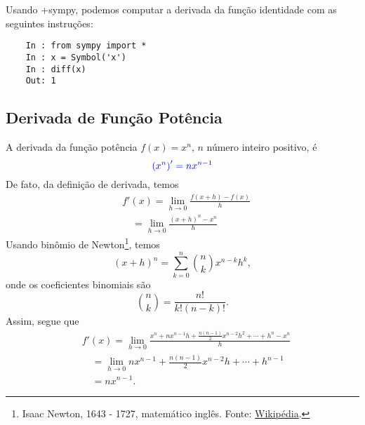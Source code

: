 \ifispython
\begin{ex}
  Usando {\python}+{sympy}, podemos computar a derivada da função identidade com as seguintes instruções:
  \begin{lstlisting}
    In : from sympy import *
    In : x = Symbol('x')
    In : diff(x)
    Out: 1
  \end{lstlisting}
\end{ex}
\fi

\subsection{Derivada de Função Potência}\label{cap_deriv_sec_funcip:ssec:funpot}

A derivada da função potência $f(x) = x^n$, $n$ número inteiro positivo, é
\begin{equation}
  {\color{blue}\left(x^n\right)' = nx^{n-1}}
\end{equation}
De fato, da definição de derivada, temos
\begin{align}
  & f'(x) = \lim_{h\to 0} \frac{f(x+h)-f(x)}{h}\\
  & \text{}\quad = \lim_{h\to 0} \frac{(x+h)^n-x^n}{h}
\end{align}
Usando binômio de Newton\footnote{Isaac Newton, 1643 - 1727, matemático inglês. Fonte: \href{https://pt.wikipedia.org/wiki/Isaac_Newton}{Wikipédia}.}, temos
\begin{equation}
  (x+h)^n = \sum_{k=0}^n \binom{n}{k}x^{n-k}h^k,
\end{equation}
onde os coeficientes binomiais são
\begin{equation}
  \binom{n}{k} = \frac{n!}{k!(n-k)!}.
\end{equation}
Assim, segue que
\begin{align}
  & f'(x) = \lim_{h\to 0} \frac{x^n+nx^{n-1}h+\frac{n(n-1)}{2}x^{n-2}h^2 + \cdots +h^n-x^n}{h}\\
  & \text{}\quad = \lim_{h\to 0} nx^{n-1}+\frac{n(n-1)}{2}x^{n-2}h+\cdots+h^{n-1}\\
  & \text{}\quad = nx^{n-1}.
\end{align}

